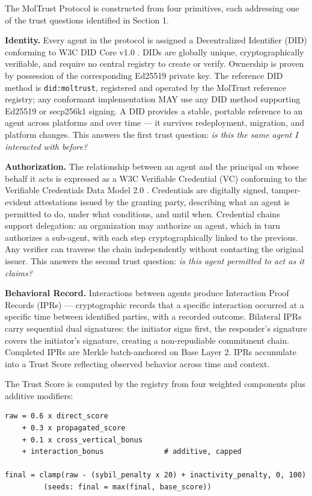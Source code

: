 The MolTrust Protocol is constructed from four primitives, each addressing one of the trust questions identified in Section 1.


\textbf{Identity.} Every agent in the protocol is assigned a Decentralized Identifier (DID) conforming to W3C DID Core v1.0 \cite{ref6_w3cdid}. DIDs are globally unique, cryptographically verifiable, and require no central registry to create or verify. Ownership is proven by possession of the corresponding Ed25519 private key. The reference DID method is \texttt{did:moltrust}, registered and operated by the MolTrust reference registry; any conformant implementation MAY use any DID method supporting Ed25519 or secp256k1 signing. A DID provides a stable, portable reference to an agent across platforms and over time — it survives redeployment, migration, and platform changes. This answers the first trust question: \textit{is this the same agent I interacted with before?}


\textbf{Authorization.} The relationship between an agent and the principal on whose behalf it acts is expressed as a W3C Verifiable Credential (VC) conforming to the Verifiable Credentials Data Model 2.0 \cite{ref7_w3cvc}. Credentials are digitally signed, tamper-evident attestations issued by the granting party, describing what an agent is permitted to do, under what conditions, and until when. Credential chains support delegation: an organization may authorize an agent, which in turn authorizes a sub-agent, with each step cryptographically linked to the previous. Any verifier can traverse the chain independently without contacting the original issuer. This answers the second trust question: \textit{is this agent permitted to act as it claims?}


\textbf{Behavioral Record.} Interactions between agents produce Interaction Proof Records (IPRs) — cryptographic records that a specific interaction occurred at a specific time between identified parties, with a recorded outcome. Bilateral IPRs carry sequential dual signatures: the initiator signs first, the responder's signature covers the initiator's signature, creating a non-repudiable commitment chain. Completed IPRs are Merkle batch-anchored on Base Layer 2. IPRs accumulate into a Trust Score reflecting observed behavior across time and context.


The Trust Score is computed by the registry from four weighted components plus additive modifiers:


\begin{lstlisting}[basicstyle=\ttfamily\small]
raw = 0.6 x direct_score
    + 0.3 x propagated_score
    + 0.1 x cross_vertical_bonus
    + interaction_bonus              # additive, capped

final = clamp(raw - (sybil_penalty x 20) + inactivity_penalty, 0, 100)
         (seeds: final = max(final, base_score))
\end{lstlisting}

